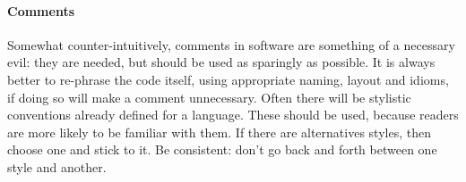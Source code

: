 \paragraph{Comments}
Somewhat counter-intuitively, comments in software are something of a necessary evil: they are needed, but should be used as sparingly as possible. It is always better to re-phrase the code itself, using appropriate naming, layout and idioms, if doing so will make a comment unnecessary.
Often there will be stylistic conventions already defined for a language. These should be used, because readers are more likely to be familiar with them. If there are alternatives styles, then choose one and stick to it. Be consistent: don’t go back and forth between one style and another.  

